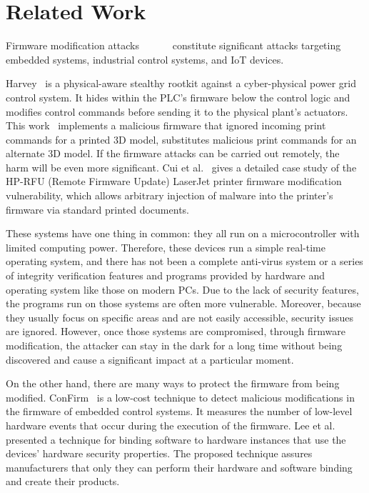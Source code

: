 \section{Related Work}
\label{sec:implant-relatedwork}



Firmware modification attacks~\cite{newman2011scada}~\cite{basnight2013firmware}~\cite{blanco2012one}~\cite{cui2013firmware}~\cite{konstantinou2015impact}~\cite{schulz2017nexmon} constitute significant attacks targeting embedded systems, industrial control systems, and IoT devices. 

Harvey~\cite{garcia2017hey} is a physical-aware stealthy rootkit against a cyber-physical power grid control system. It hides within the PLC's firmware below the control logic and modifies control commands before sending it to the physical plant's actuators. This work~\cite{moore2017implications} implements a malicious firmware that ignored incoming print commands for a printed 3D model, substitutes malicious print commands for an alternate 3D model.  If the firmware attacks can be carried out remotely, the harm will be even more significant. Cui et al.~\cite{cui2013firmware} gives a detailed case study of the HP-RFU (Remote Firmware Update) LaserJet printer firmware modification vulnerability, which allows arbitrary injection of malware into the printer's firmware via standard printed documents.

These systems have one thing in common: they all run on a microcontroller with limited computing power. Therefore, these devices run a simple real-time operating system, and there has not been a complete anti-virus system or a series of integrity verification features and programs provided by hardware and operating system like those on modern PCs. Due to the lack of security features, the programs run on those systems are often more vulnerable. Moreover, because they usually focus on specific areas and are not easily accessible, security issues are ignored. However, once those systems are compromised, through firmware modification, the attacker can stay in the dark for a long time without being discovered and cause a significant impact at a particular moment.

On the other hand, there are many ways to protect the firmware from being modified. ConFirm~\cite{wang2015confirm} is a low-cost technique to detect malicious modifications in the firmware of embedded control systems. It measures the number of low-level hardware events that occur during the execution of the firmware. Lee et al.~\cite{lee2016binding} presented a technique for binding software to hardware instances that use the devices' hardware security properties. The proposed technique assures manufacturers that only they can perform their hardware and software binding and create their products.

